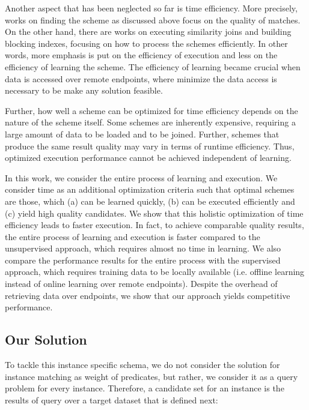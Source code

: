 Another aspect that has been neglected so far is time efficiency. More precisely, works on finding the scheme as discussed above focus on the quality of matches. On the other hand, there are works on executing similarity joins and building blocking indexes, focusing on how to process the schemes efficiently. In other words, more emphasis is put on the efficiency of execution and less on the efficiency of learning the scheme. The efficiency of learning became crucial when data is accessed over remote endpoints, where minimize the data access is necessary to be make any solution feasible.  

Further, how well a scheme can be optimized for time efficiency depends on the nature of the scheme itself. Some schemes are inherently expensive, requiring a large amount of data to be loaded and to be joined. Further, schemes that produce the same result quality may vary in terms of runtime efficiency. Thus, optimized execution performance cannot be achieved independent of learning. 

In this work, we consider the entire process of learning and execution. We consider time as an additional optimization criteria such that optimal schemes are those, which (a) can be learned quickly, (b) can be executed efficiently and (c) yield high quality candidates. We show that this holistic optimization of time efficiency leads to faster execution. In fact, to achieve comparable quality results, the entire process of learning and execution is faster compared to the unsupervised approach, which requires almost no time in learning.  We also compare the performance results for the entire process with the supervised approach, which requires training data to be locally available (i.e. offline learning instead of online learning over remote endpoints). Despite the overhead of retrieving data over endpoints, we show that our approach yields competitive performance. 


\subsection{Our Solution}
To tackle this instance specific schema, we do not consider the solution for instance matching as weight of predicates, but rather, we consider it as a query problem for every instance. Therefore, a candidate set for an instance is the results of query over a target dataset that is defined next:


